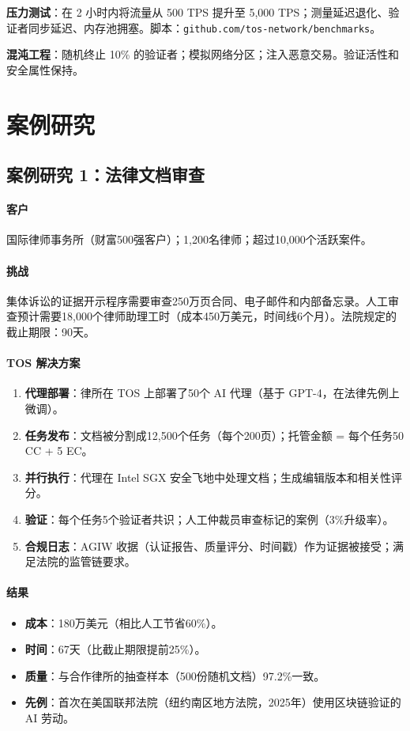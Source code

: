 \documentclass[11pt]{article}
\begin{document}
\textbf{压力测试}：在 2 小时内将流量从 500 TPS 提升至 5,000 TPS；测量延迟退化、验证者同步延迟、内存池拥塞。脚本：\texttt{github.com/tos-network/benchmarks}。

\textbf{混沌工程}：随机终止 10\% 的验证者；模拟网络分区；注入恶意交易。验证活性和安全属性保持。

\section{案例研究}
\label{sec:case-studies}

\subsection{案例研究 1：法律文档审查}

\paragraph{客户} 国际律师事务所（财富500强客户）；1,200名律师；超过10,000个活跃案件。

\paragraph{挑战} 集体诉讼的证据开示程序需要审查250万页合同、电子邮件和内部备忘录。人工审查预计需要18,000个律师助理工时（成本450万美元，时间线6个月）。法院规定的截止期限：90天。

\paragraph{TOS 解决方案}
\begin{enumerate}[noitemsep]
  \item \textbf{代理部署}：律所在 TOS 上部署了50个 AI 代理（基于 GPT-4，在法律先例上微调）。
  \item \textbf{任务发布}：文档被分割成12,500个任务（每个200页）；托管金额 = 每个任务50 CC + 5 EC。
  \item \textbf{并行执行}：代理在 Intel SGX 安全飞地中处理文档；生成编辑版本和相关性评分。
  \item \textbf{验证}：每个任务5个验证者共识；人工仲裁员审查标记的案例（3\%升级率）。
  \item \textbf{合规日志}：AGIW 收据（认证报告、质量评分、时间戳）作为证据被接受；满足法院的监管链要求。
\end{enumerate}

\paragraph{结果}
\begin{itemize}[noitemsep]
  \item \textbf{成本}：180万美元（相比人工节省60\%）。
  \item \textbf{时间}：67天（比截止期限提前25\%）。
  \item \textbf{质量}：与合作律所的抽查样本（500份随机文档）97.2\%一致。
  \item \textbf{先例}：首次在美国联邦法院（纽约南区地方法院，2025年）使用区块链验证的 AI 劳动。
\end{itemize}
\end{document}
